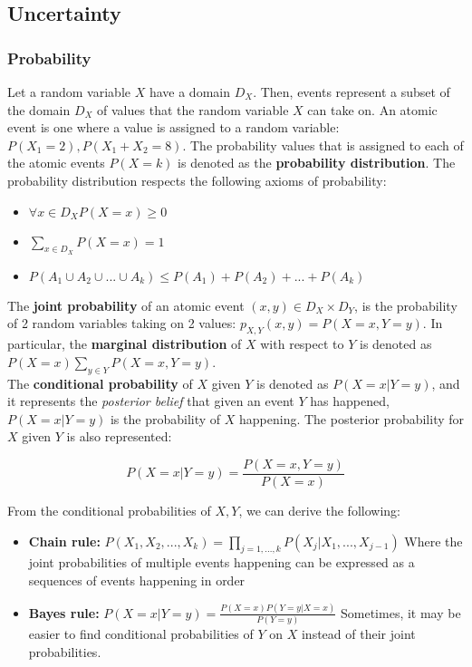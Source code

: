 \documentclass[12pt]{article}
\begin{document}
\subsection{Uncertainty}

\subsubsection{Probability}

Let a random variable $X$ have a domain $D_X$. Then, events represent a subset of the domain $D_X$ of values that the random variable $X$ can take on. An atomic event is one where a value is assigned to a random variable: $P(X_1 = 2), P(X_1 + X_2 = 8)$. The probability values that is assigned to each of the atomic events $P(X = k)$ is denoted as the \textbf{probability distribution}. The probability distribution respects the following axioms of probability:

\begin{itemize}
\item $\forall x \in D_X P(X = x) \geq 0$
\item $\sum_{x \in D_X} P(X=x) = 1$
\item $P(A_1 \cup A_2 \cup ... \cup A_k) \leq P(A_1) + P(A_2) + ... + P(A_k)$
\end{itemize}

The \textbf{joint probability} of an atomic event $(x,y) \in D_X \times D_Y$, is the probability of 2 random variables taking on 2 values: $p_{X,Y}(x, y) = P(X = x, Y = y)$. In particular, the \textbf{marginal distribution} of $X$ with respect to $Y$ is denoted as $P(X = x) \sum_{y \in Y} P(X = x, Y= y)$.\\

The \textbf{conditional probability} of $X$ given $Y$ is denoted as $P(X = x | Y = y)$, and it represents the \textit{posterior belief} that given an event $Y$ has happened, $P(X = x | Y = y)$ is the probability of $X$ happening. The posterior probability for $X$ given $Y$ is also represented:

\begin{equation*}
P(X = x | Y = y) = \frac{P(X = x, Y = y)}{P(X = x)}
\end{equation*}

From the conditional probabilities of $X, Y$, we can derive the following:

\begin{itemize}
\item \textbf{Chain rule:} $P(X_1, X_2,..., X_k) = \prod_{j =1,...,k} P(X_j | X_1, ..., X_{j-1})$
Where the joint probabilities of multiple events happening can be expressed as a sequences of events happening in order
\item \textbf{Bayes rule:} $P(X = x | Y = y) = \frac{P(X = x)P(Y = y | X = x)}{P(Y = y)}$
Sometimes, it may be easier to find conditional probabilities of $Y$ on $X$ instead of their joint probabilities.
\end{itemize}
\end{document}
